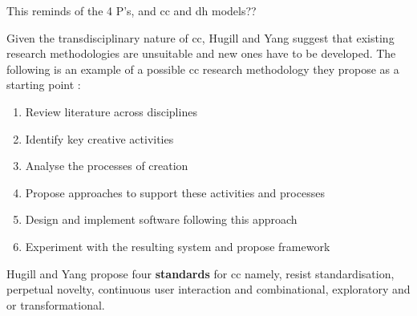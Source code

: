 \begin{draft}
  This reminds of the 4 P’s, and \gls{cc} and \gls{dh} models??
\end{draft}


Given the transdisciplinary nature of \gls{cc}, Hugill and Yang suggest that existing research methodologies are unsuitable and new ones have to be developed. The following is an example of a possible \gls{cc} research methodology they propose as a starting point \autocite[p.17]{Hugill2013c}:

\begin{enumerate}
  \item Review literature across disciplines
  \item Identify key creative activities
  \item Analyse the processes of creation
  \item Propose approaches to support these activities and processes
  \item Design and implement software following this approach
  \item Experiment with the resulting system and propose framework
\end{enumerate}

Hugill and Yang propose four \textbf{standards} for \gls{cc} \autocite[p.17]{Hugill2013c} namely, resist standardisation, perpetual novelty, continuous user interaction and combinational, exploratory and or transformational.

